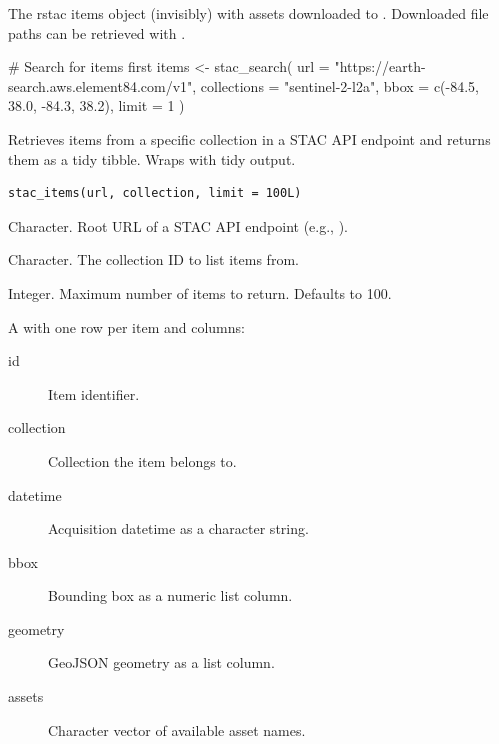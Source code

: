 \documentclass[a4paper]{book}
\begin{document}
%
\begin{Value}
The rstac items object (invisibly) with assets downloaded to
. Downloaded file paths can be retrieved with
.
\end{Value}
%
\begin{Examples}
\begin{ExampleCode}


# Search for items first
items <- stac_search(
  url = "https://earth-search.aws.element84.com/v1",
  collections = "sentinel-2-l2a",
  bbox = c(-84.5, 38.0, -84.3, 38.2),
  limit = 1
)


\end{ExampleCode}
\end{Examples}
%
\begin{Description}
Retrieves items from a specific collection in a STAC API endpoint and
returns them as a tidy tibble. Wraps  with tidy output.
\end{Description}
%
\begin{Usage}
\begin{verbatim}
stac_items(url, collection, limit = 100L)
\end{verbatim}
\end{Usage}
%
\begin{Arguments}
\begin{ldescription}
\item[\code{url}] Character. Root URL of a STAC API endpoint
(e.g., ).

\item[\code{collection}] Character. The collection ID to list items from.

\item[\code{limit}] Integer. Maximum number of items to return. Defaults to 100.
\end{ldescription}
\end{Arguments}
%
\begin{Value}
A  with one row per item and columns:
\begin{description}

\item[id] Item identifier.
\item[collection] Collection the item belongs to.
\item[datetime] Acquisition datetime as a character string.
\item[bbox] Bounding box as a numeric list column.
\item[geometry] GeoJSON geometry as a list column.
\item[assets] Character vector of available asset names.

\end{description}

\end{Value}
\end{document}
